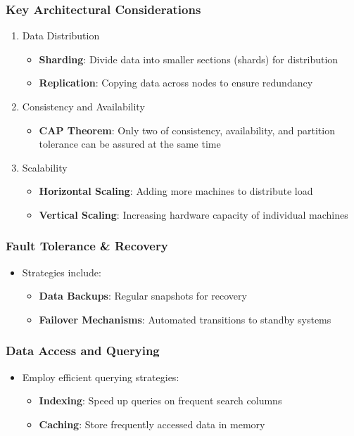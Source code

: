\documentclass[aspectratio=169]{beamer}
\begin{document}
\begin{frame}[fragile]
    \frametitle{Key Architectural Considerations}
    \begin{enumerate}
        \item Data Distribution
            \begin{itemize}
                \item \textbf{Sharding}: Divide data into smaller sections (shards) for distribution
                \item \textbf{Replication}: Copying data across nodes to ensure redundancy
            \end{itemize}
        \item Consistency and Availability
            \begin{itemize}
                \item \textbf{CAP Theorem}: Only two of consistency, availability, and partition tolerance can be assured at the same time
            \end{itemize}
        \item Scalability
            \begin{itemize}
                \item \textbf{Horizontal Scaling}: Adding more machines to distribute load
                \item \textbf{Vertical Scaling}: Increasing hardware capacity of individual machines
            \end{itemize}
    \end{enumerate}
\end{frame}

\begin{frame}[fragile]
    \frametitle{Fault Tolerance \& Recovery}
    \begin{itemize}
        \item Strategies include:
            \begin{itemize}
                \item \textbf{Data Backups}: Regular snapshots for recovery
                \item \textbf{Failover Mechanisms}: Automated transitions to standby systems
            \end{itemize}
    \end{itemize}
\end{frame}

\begin{frame}[fragile]
    \frametitle{Data Access and Querying}
    \begin{itemize}
        \item Employ efficient querying strategies:
            \begin{itemize}
                \item \textbf{Indexing}: Speed up queries on frequent search columns
                \item \textbf{Caching}: Store frequently accessed data in memory
            \end{itemize}
    \end{itemize}
\end{frame}
\end{document}
